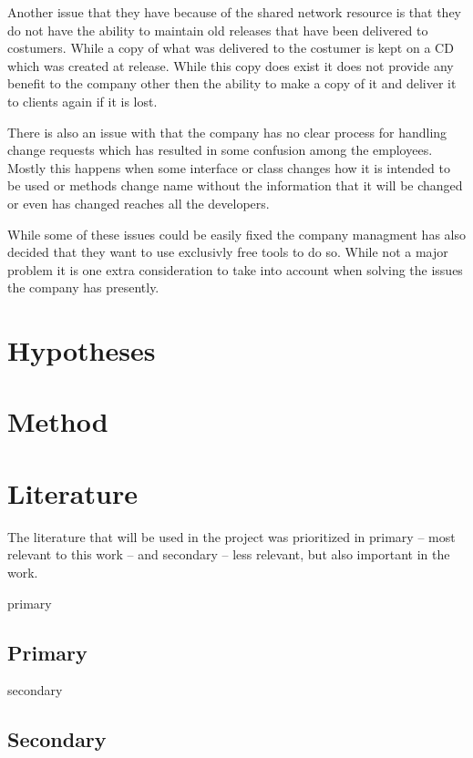 \documentclass[a4paper]{article}
\begin{document}
Another issue that they have because of the shared network resource is that they do not have the ability to maintain old releases that have been delivered to costumers. While a copy of what was delivered to the costumer is kept on a CD which was created at release. While this copy does exist it does not provide any benefit to the company other then the ability to make a copy of it and deliver it to clients again if it is lost.

There is also an issue with that the company has no clear process for handling change requests which has resulted in some confusion among the employees. Mostly this happens when some interface or class changes how it is intended to be used or methods change name without the information that it will be changed or even has changed reaches all the developers.

While some of these issues could be easily fixed the company managment has also decided that they want to use exclusivly free tools to do so. While not a major problem it is one extra consideration to take into account when solving the issues the company has presently.

\section{Hypotheses}

\section{Method}

\newpage
\appendix
\section{Literature}

The literature that will be used in the project was prioritized in primary -- most relevant to this work -- and secondary -- less relevant, but also important in the work. 
\begin{btSect}[alpha]{primary}
\subsection{Primary}
\btPrintAll
\end{btSect}

\begin{btSect}[alpha]{secondary}
\subsection{Secondary}
\btPrintAll
\end{btSect}
\end{document}
